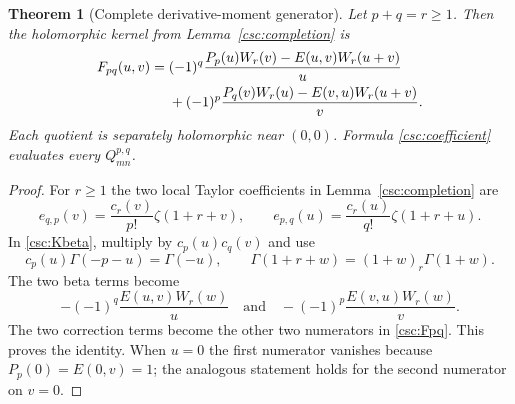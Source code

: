 \documentclass[11pt,a4paper]{article}
\numberwithin{equation}{section}
\newtheorem{theorem}{Theorem}[section]
\theoremstyle{definition}
\begin{document}
\begin{theorem}[Complete derivative-moment generator]\label{csc:derivative}
Let $p+q=r\ge1$. Then the holomorphic kernel from Lemma~\ref{csc:completion} is
\begin{align}
F_{pq}(u,v)={}&(-1)^q
\frac{P_p(u)W_r(v)-E(u,v)W_r(u+v)}u\notag\\
&+(-1)^p
\frac{P_q(v)W_r(u)-E(v,u)W_r(u+v)}v.\label{csc:Fpq}
\end{align}
Each quotient is separately holomorphic near $(0,0)$. Formula \eqref{csc:coefficient} evaluates every $Q_{mn}^{p,q}$.
\end{theorem}
\begin{proof}
For $r\ge1$ the two local Taylor coefficients in Lemma~\ref{csc:completion} are
\[
e_{q,p}(v)=\frac{c_r(v)}{p!}\zeta(1+r+v),\qquad
e_{p,q}(u)=\frac{c_r(u)}{q!}\zeta(1+r+u).
\]
In \eqref{csc:Kbeta}, multiply by $c_p(u)c_q(v)$ and use
\[
c_p(u)\Gamma(-p-u)=\Gamma(-u),\qquad
\Gamma(1+r+w)=(1+w)_r\Gamma(1+w).
\]
The two beta terms become
\[
-(-1)^q\frac{E(u,v)W_r(w)}u
\quad\text{and}\quad
-(-1)^p\frac{E(v,u)W_r(w)}v.
\]
The two correction terms become the other two numerators in \eqref{csc:Fpq}. This proves the identity. When $u=0$ the first numerator vanishes because $P_p(0)=E(0,v)=1$; the analogous statement holds for the second numerator on $v=0$.
\end{proof}
\end{document}
